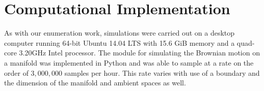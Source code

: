 \section{Computational Implementation}

As with our enumeration work, simulations were carried out on a desktop computer running 64-bit Ubuntu 14.04 LTS with 15.6 GiB memory and a quad-core 3.20GHz Intel processor. The module for simulating the Brownian motion on a manifold was implemented in Python and was able to sample at a rate on the order of $3,000,000$ samples per hour. This rate varies with use of a boundary and the dimension of the manifold and ambient spaces as well. 

